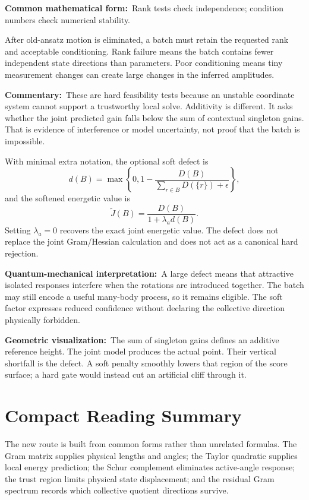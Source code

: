 \documentclass[10pt,twocolumn]{article}
\newcommand{\form}[1]{\par\noindent\textbf{Common mathematical form:}\ #1\par}
\newcommand{\commentary}[1]{\par\noindent\textbf{Commentary:}\ #1\par}
\newcommand{\phys}[1]{\par\noindent\textbf{Quantum-mechanical interpretation:}\ #1\par}
\newcommand{\geom}[1]{\par\noindent\textbf{Geometric visualization:}\ \textcolor{teal!70!black}{#1}\par}
\begin{document}
\form{Rank tests check independence; condition numbers check numerical
stability.}

After old-ansatz motion is eliminated, a batch must retain the requested rank
and acceptable conditioning. Rank failure means the batch contains fewer
independent state directions than parameters. Poor conditioning means tiny
measurement changes can create large changes in the inferred amplitudes.

\commentary{These are hard feasibility tests because an unstable coordinate
system cannot support a trustworthy local solve. Additivity is different. It
asks whether the joint predicted gain falls below the sum of contextual
singleton gains. That is evidence of interference or model uncertainty, not
proof that the batch is impossible.}

With minimal extra notation, the optional soft defect is
\[
d(B)=\max\left\{0,
1-\frac{D(B)}
{\sum_{r\in B}D(\{r\})+\epsilon}
\right\},
\]
and the softened energetic value is
\[
\widetilde J(B)
=\frac{D(B)}{1+\lambda_a d(B)}.
\]
Setting \(\lambda_a=0\) recovers the exact joint energetic value. The defect
does not replace the joint Gram/Hessian calculation and does not act as a
canonical hard rejection.

\phys{A large defect means that attractive isolated responses interfere when
the rotations are introduced together. The batch may still encode a useful
many-body process, so it remains eligible. The soft factor expresses reduced
confidence without declaring the collective direction physically forbidden.}

\geom{The sum of singleton gains defines an additive reference height. The
joint model produces the actual point. Their vertical shortfall is the defect.
A soft penalty smoothly lowers that region of the score surface; a hard gate
would instead cut an artificial cliff through it.}

\section*{Compact Reading Summary}

The new route is built from common forms rather than unrelated formulas.
The Gram matrix supplies physical lengths and angles; the Taylor quadratic
supplies local energy prediction; the Schur complement eliminates active-angle
response; the trust region limits physical state displacement; and the
residual Gram spectrum records which collective quotient directions survive.
\end{document}
